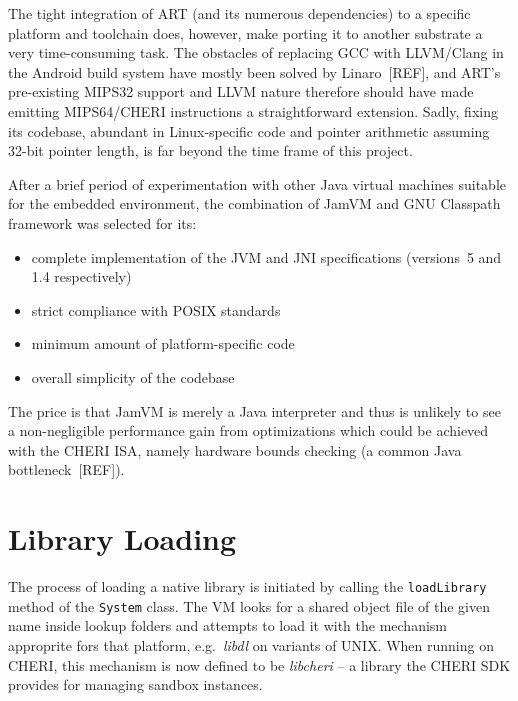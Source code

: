 \documentclass[a4paper,12pt,twoside,openright]{report}
\newcommand{\class}[1]{\texttt{#1}}
\newcommand{\tool}[1]{\emph{#1}}
\newcommand{\lib}[1]{\tool{lib#1}}
\begin{document}
The tight integration of ART (and its numerous dependencies) to a specific platform and toolchain does, however, make porting it to another substrate a very time-consuming task. The obstacles of replacing GCC with LLVM/Clang in the Android build system have mostly been solved by Linaro~[REF], and ART's pre-existing MIPS32 support and LLVM nature therefore should have made emitting MIPS64/CHERI instructions a straightforward extension. Sadly, fixing its codebase, abundant in Linux-specific code and pointer arithmetic assuming 32-bit pointer length, is far beyond the time frame of this project.

After a brief period of experimentation with other Java virtual machines suitable for the embedded environment, the combination of JamVM and GNU Classpath framework was selected for its:
\begin{itemize}
\item complete implementation of the JVM and JNI specifications (versions~5 and 1.4 respectively)
\item strict compliance with POSIX standards
\item minimum amount of platform-specific code
\item overall simplicity of the codebase
\end{itemize}
The price is that JamVM is merely a Java interpreter and thus is unlikely to see a non-negligible performance gain from optimizations which could be achieved with the CHERI ISA, namely hardware bounds checking (a common Java bottleneck~[REF]).

\section{Library Loading}

The process of loading a native library is initiated by calling the \texttt{loadLibrary} method of the \class{System} class. The VM looks for a shared object file of the given name inside lookup folders and attempts to load it with the mechanism approprite fors that platform, e.g.\ \lib{dl} on variants of UNIX. When running on CHERI, this mechanism is now defined to be \lib{cheri} -- a library the CHERI SDK provides for managing sandbox instances. 
\end{document}
